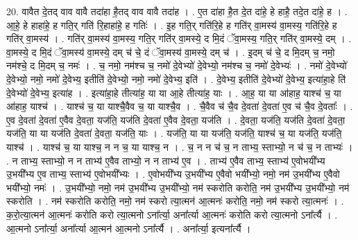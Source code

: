 \documentclass[17pt]{extarticle}
\begin{document}
20. वावैत दे॒तद् वाव वावै तदा॑हा है॒तद् वाव वावै तदा॑ह । . ए॒त दा॑हा है॒त दे॒त दा॑हे॒ हे हाहै॒ तदे॒त दा॑हे॒ ह । . आ॒हे॒ हे हाहा॑हे॒ ह गति॒र् गति॑ रि॒हाहा॑हे॒ ह गतिः॑ । . इ॒ह गति॒र् गति॑रि॒हे ह गति॑र् वा॒मस्य॑ वा॒मस्य॒ गति॑रि॒हे ह गति॑र् वा॒मस्य॑ । . गति॑र् वा॒मस्य॑ वा॒मस्य॒ गति॒र् गति॑र् वा॒मस्ये॒ द मि॒दं ॅवा॒मस्य॒ गति॒र् गति॑र् वा॒मस्ये॒ दम् । . वा॒मस्ये॒ द मि॒दं ॅवा॒मस्य॑ वा॒मस्ये॒ दम् च॑ चे॒ दं ॅवा॒मस्य॑ वा॒मस्ये॒ दम् च॑ । . इ॒दम् च॑ चे॒ द मि॒दम् च॒ नमो॒ नम॑श्चे॒ द मि॒दम् च॒ नमः॑ । . च॒ नमो॒ नम॑श्च च॒ नमो॑ दे॒वेभ्यो॑ दे॒वेभ्यो॒ नम॑श्च च॒ नमो॑ दे॒वेभ्यः॑ । . नमो॑ दे॒वेभ्यो॑ दे॒वेभ्यो॒ नमो॒ नमो॑ दे॒वेभ्य॒ इतीति॑ दे॒वेभ्यो॒ नमो॒ नमो॑ दे॒वेभ्य॒ इति॑ । . दे॒वेभ्य॒ इतीति॑ दे॒वेभ्यो॑ दे॒वेभ्य॒ इत्या॑हा॒हे ति॑ दे॒वेभ्यो॑ दे॒वेभ्य॒ इत्या॑ह । . इत्या॑हा॒हे तीत्या॑ह॒ या या आ॒हे तीत्या॑ह॒ याः । . आ॒ह॒ या या आ॑हाह॒ याश्च॑ च॒ या आ॑हाह॒ याश्च॑ । . याश्च॑ च॒ या याश्चै॒वैव च॒ या याश्चै॒व । . चै॒वैव च॑ चै॒व दे॒वता॑ दे॒वता॑ ए॒व च॑ चै॒व दे॒वताः᳚ । . ए॒व दे॒वता॑ दे॒वता॑ ए॒वैव दे॒वता॒ यज॑ति॒ यज॑ति दे॒वता॑ ए॒वैव दे॒वता॒ यज॑ति । . दे॒वता॒ यज॑ति॒ यज॑ति दे॒वता॑ दे॒वता॒ यज॑ति॒ या या यज॑ति दे॒वता॑ दे॒वता॒ यज॑ति॒ याः । . यज॑ति॒ या या यज॑ति॒ यज॑ति॒ याश्च॑ च॒ या यज॑ति॒ यज॑ति॒ याश्च॑ । . याश्च॑ च॒ या याश्च॒ न न च॒ या याश्च॒ न । . च॒ न न च॑ च॒ न ताभ्य॒ स्ताभ्यो॒ न च॑ च॒ न ताभ्यः॑ । . न ताभ्य॒ स्ताभ्यो॒ न न ताभ्य॑ ए॒वैव ताभ्यो॒ न न ताभ्य॑ ए॒व । . ताभ्य॑ ए॒वैव ताभ्य॒ स्ताभ्य॑ ए॒वोभयी᳚भ्य उ॒भयी᳚भ्य ए॒व ताभ्य॒ स्ताभ्य॑ ए॒वोभयी᳚भ्यः । . ए॒वोभयी᳚भ्य उ॒भयी᳚भ्य ए॒वैवो भयी᳚भ्यो॒ नमो॒ नम॑ उ॒भयी᳚भ्य ए॒वैवो भयी᳚भ्यो॒ नमः॑ । . उ॒भयी᳚भ्यो॒ नमो॒ नम॑ उ॒भयी᳚भ्य उ॒भयी᳚भ्यो॒ नम॑ स्करोति करोति॒ नम॑ उ॒भयी᳚भ्य उ॒भयी᳚भ्यो॒ नम॑ स्करोति । . नम॑ स्करोति करोति॒ नमो॒ नम॑ स्करो त्या॒त्मन॑ आ॒त्मनः॑ करोति॒ नमो॒ नम॑ स्करो त्या॒त्मनः॑ । . क॒रो॒त्या॒त्मन॑ आ॒त्मनः॑ करोति करो त्या॒त्मनो ऽना᳚र्त्या॒ अना᳚र्त्या आ॒त्मनः॑ करोति करो त्या॒त्मनो ऽना᳚र्त्यै । . आ॒त्मनो ऽना᳚र्त्या॒ अना᳚र्त्या आ॒त्मन॑ आ॒त्मनो ऽना᳚र्त्यै । . अना᳚र्त्या॒ इत्यना᳚र्त्यै । \newline
\pagebreak
{}
\end{document}
